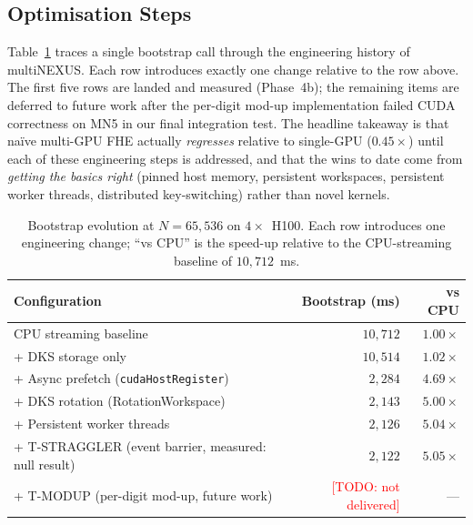 \documentclass[conference]{IEEEtran}
\newcommand{\TODO}[1]{\textcolor{red}{[TODO: #1]}}
\begin{document}
\subsection{Optimisation Steps}

Table~\ref{tab:opt-evolution} traces a single bootstrap call through
the engineering history of multiNEXUS. Each row introduces exactly one
change relative to the row above. The first five rows are landed and
measured (Phase~4b); the remaining items are deferred to future work
after the per-digit mod-up implementation failed CUDA correctness on
MN5 in our final integration test. The headline takeaway is that
naïve multi-GPU FHE actually \emph{regresses} relative to single-GPU
($0.45\times$) until each of these engineering steps is addressed,
and that the wins to date come from \emph{getting the basics right}
(pinned host memory, persistent workspaces, persistent worker threads,
distributed key-switching) rather than novel kernels.

\begin{table}[h]
\centering
\caption{Bootstrap evolution at $N{=}65{,}536$ on $4\times$~H100. Each
row introduces one engineering change; ``vs CPU'' is the speed-up
relative to the CPU-streaming baseline of $10{,}712$~ms.}
\label{tab:opt-evolution}
\begin{tabular}{lrr}
\toprule
Configuration & Bootstrap (ms) & vs CPU \\
\midrule
CPU streaming baseline                                    & $10{,}712$              & $1.00\times$ \\
+ DKS storage only                                        & $10{,}514$              & $1.02\times$ \\
+ Async prefetch (\texttt{cudaHostRegister})              & $2{,}284$               & $4.69\times$ \\
+ DKS rotation (RotationWorkspace)                        & $2{,}143$               & $5.00\times$ \\
+ Persistent worker threads                               & $2{,}126$               & $5.04\times$ \\
+ T-STRAGGLER (event barrier, measured: null result)      & $2{,}122$               & $5.05\times$ \\
+ T-MODUP (per-digit mod-up, future work)                 & \TODO{not delivered}    & --- \\
\bottomrule
\end{tabular}
\end{table}
\end{document}
